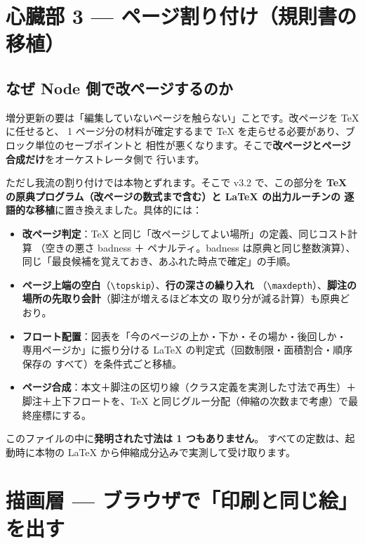 \documentclass[11pt,a4paper]{ltjsarticle}
\newcommand{\cs}[1]{\texttt{\textbackslash #1}}
\begin{document}
\section{心臓部 3 --- ページ割り付け（規則書の移植）}
\label{sec:pagebuilder}

\subsection{なぜ Node 側で改ページするのか}

増分更新の要は「編集していないページを触らない」ことです。改ページを TeX に任せると、
1 ページ分の材料が確定するまで TeX を走らせる必要があり、ブロック単位のセーブポイントと
相性が悪くなります。そこで\textbf{改ページとページ合成だけ}をオーケストレータ側で
行います。

ただし我流の割り付けでは本物とずれます。そこで v3.2 で、この部分を
\textbf{TeX の原典プログラム（改ページの数式まで含む）と LaTeX の出力ルーチンの
逐語的な移植}に置き換えました。具体的には：

\begin{itemize}
\item \textbf{改ページ判定}：TeX と同じ「改ページしてよい場所」の定義、同じコスト計算
  （空きの悪さ badness ＋ ペナルティ。badness は原典と同じ整数演算）、
  同じ「最良候補を覚えておき、あふれた時点で確定」の手順。
\item \textbf{ページ上端の空白}（\cs{topskip}）、\textbf{行の深さの繰り入れ}
  （\cs{maxdepth}）、\textbf{脚注の場所の先取り会計}（脚注が増えるほど本文の
  取り分が減る計算）も原典どおり。
\item \textbf{フロート配置}：図表を「今のページの上か・下か・その場か・後回しか・
  専用ページか」に振り分ける LaTeX の判定式（回数制限・面積割合・順序保存の
  すべて）を条件式ごと移植。
\item \textbf{ページ合成}：本文＋脚注の区切り線（クラス定義を実測した寸法で再生）＋
  脚注＋上下フロートを、TeX と同じグルー分配（伸縮の次数まで考慮）で最終座標にする。
\end{itemize}

このファイルの中に\textbf{発明された寸法は 1 つもありません}。
すべての定数は、起動時に本物の LaTeX から伸縮成分込みで実測して受け取ります。

\section{描画層 --- ブラウザで「印刷と同じ絵」を出す}
\label{sec:render}
\end{document}
